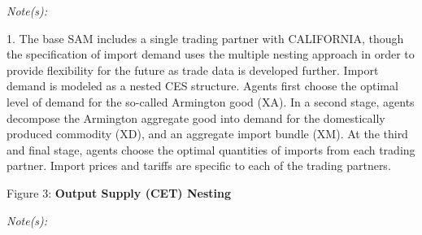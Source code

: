 \documentclass{article}
\begin{document}
\textit{Note(s):}

\begin{footnotesize}
1. \hspace{10pt} The base SAM includes a single trading partner with CALIFORNIA, though the specification of import demand uses the multiple nesting approach in order to provide flexibility for the future as trade data is developed further. Import demand is modeled as a nested CES structure. Agents first choose the optimal level of demand for the so-called Armington good (XA). In a second stage, agents decompose the Armington aggregate good into demand for the domestically produced commodity (XD), and an aggregate import bundle (XM). At the third and final stage, agents choose the optimal quantities of imports from each trading partner. Import prices and tariffs are specific to each of the trading partners.

\end{footnotesize}

\newpage

\begin{center}

Figure 3: \textbf{Output Supply (CET) Nesting}

\vspace{20pt}
\begin{scriptsize}
\end{scriptsize}
\end{center}

\textit{Note(s):}
\end{document}
